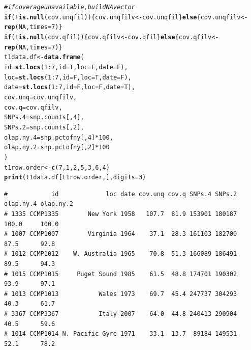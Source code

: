 \documentclass{article}\usepackage[]{graphicx}\usepackage[]{color}
\makeatletter
\newcommand{\hlnum}[1]{\textcolor[rgb]{0.686,0.059,0.569}{#1}}%
\newcommand{\hlcom}[1]{\textcolor[rgb]{0.678,0.584,0.686}{\textit{#1}}}%
\newcommand{\hlopt}[1]{\textcolor[rgb]{0,0,0}{#1}}%
\newcommand{\hlstd}[1]{\textcolor[rgb]{0.345,0.345,0.345}{#1}}%
\newcommand{\hlkwa}[1]{\textcolor[rgb]{0.161,0.373,0.58}{\textbf{#1}}}%
\newcommand{\hlkwb}[1]{\textcolor[rgb]{0.69,0.353,0.396}{#1}}%
\newcommand{\hlkwc}[1]{\textcolor[rgb]{0.333,0.667,0.333}{#1}}%
\newcommand{\hlkwd}[1]{\textcolor[rgb]{0.737,0.353,0.396}{\textbf{#1}}}%
\newenvironment{kframe}{%
 \def\at@end@of@kframe{}%
 \ifinner\ifhmode%
  \def\at@end@of@kframe{\end{minipage}}%
  \begin{minipage}{\columnwidth}%
 \fi\fi%
 \def\FrameCommand##1{\hskip\@totalleftmargin \hskip-\fboxsep
 \colorbox{shadecolor}{##1}\hskip-\fboxsep
     \hskip-\linewidth \hskip-\@totalleftmargin \hskip\columnwidth}%
 \MakeFramed {\advance\hsize-\width
   \@totalleftmargin\z@ \linewidth\hsize
   \@setminipage}}%
 {\par\unskip\endMakeFramed%
 \at@end@of@kframe}
\newenvironment{knitrout}{}{} %
\makeatother
\begin{document}
\begin{knitrout}\footnotesize
{}\color{fgcolor}\begin{kframe}
\begin{alltt}
\hlcom{# if coverage unavailable, build NA vector}
\hlkwa{if}\hlstd{(}\hlopt{!}\hlkwd{is.null}\hlstd{(cov.unqfil))\{cov.unqfilv} \hlkwb{<-} \hlstd{cov.unqfil\}} \hlkwa{else} \hlstd{\{cov.unqfilv} \hlkwb{<-} \hlkwd{rep}\hlstd{(}\hlnum{NA}\hlstd{,}\hlkwc{times}\hlstd{=}\hlnum{7}\hlstd{)\}}
\hlkwa{if}\hlstd{(}\hlopt{!}\hlkwd{is.null}\hlstd{(cov.qfil  ))\{cov.qfilv}   \hlkwb{<-} \hlstd{cov.qfil  \}} \hlkwa{else} \hlstd{\{cov.qfilv}   \hlkwb{<-} \hlkwd{rep}\hlstd{(}\hlnum{NA}\hlstd{,}\hlkwc{times}\hlstd{=}\hlnum{7}\hlstd{)\}}
\hlstd{t1data.df} \hlkwb{<-} \hlkwd{data.frame}\hlstd{(}
  \hlkwc{id}        \hlstd{=} \hlkwd{st.locs}\hlstd{(}\hlnum{1}\hlopt{:}\hlnum{7}\hlstd{,} \hlkwc{id}\hlstd{=T,} \hlkwc{loc}\hlstd{=F,} \hlkwc{date}\hlstd{=F),}
  \hlkwc{loc}       \hlstd{=} \hlkwd{st.locs}\hlstd{(}\hlnum{1}\hlopt{:}\hlnum{7}\hlstd{,} \hlkwc{id}\hlstd{=F,} \hlkwc{loc}\hlstd{=T,} \hlkwc{date}\hlstd{=F),}
  \hlkwc{date}      \hlstd{=} \hlkwd{st.locs}\hlstd{(}\hlnum{1}\hlopt{:}\hlnum{7}\hlstd{,} \hlkwc{id}\hlstd{=F,} \hlkwc{loc}\hlstd{=F,} \hlkwc{date}\hlstd{=T),}
  \hlkwc{cov.unq}   \hlstd{= cov.unqfilv,}
  \hlkwc{cov.q}     \hlstd{= cov.qfilv,}
  \hlkwc{SNPs.4}    \hlstd{= snp.counts[,}\hlnum{4}\hlstd{],}
  \hlkwc{SNPs.2}    \hlstd{= snp.counts[,}\hlnum{2}\hlstd{],}
  \hlkwc{olap.ny.4} \hlstd{= snp.pctofny[,}\hlnum{4}\hlstd{]}\hlopt{*}\hlnum{100}\hlstd{,}
  \hlkwc{olap.ny.2} \hlstd{= snp.pctofny[,}\hlnum{2}\hlstd{]}\hlopt{*}\hlnum{100}
\hlstd{)}
\hlstd{t1row.order} \hlkwb{<-} \hlkwd{c}\hlstd{(}\hlnum{7}\hlstd{,}\hlnum{1}\hlstd{,}\hlnum{2}\hlstd{,}\hlnum{5}\hlstd{,}\hlnum{3}\hlstd{,}\hlnum{6}\hlstd{,}\hlnum{4}\hlstd{)}
\hlkwd{print}\hlstd{(t1data.df[t1row.order,],}\hlkwc{digits}\hlstd{=}\hlnum{3}\hlstd{)}
\end{alltt}
\begin{verbatim}
#            id             loc date cov.unq cov.q SNPs.4 SNPs.2 olap.ny.4 olap.ny.2
# 1335 CCMP1335        New York 1958   107.7  81.9 153901 180187     100.0     100.0
# 1007 CCMP1007        Virginia 1964    37.1  28.3 161103 182700      87.5      92.8
# 1012 CCMP1012    W. Australia 1965    70.8  51.3 166089 186491      89.5      94.3
# 1015 CCMP1015     Puget Sound 1985    61.5  48.8 174701 190302      93.9      97.1
# 1013 CCMP1013           Wales 1973    69.7  45.4 247737 304293      40.3      61.7
# 3367 CCMP3367           Italy 2007    64.0  44.8 240413 290904      40.5      59.6
# 1014 CCMP1014 N. Pacific Gyre 1971    33.1  13.7  89184 149531      52.1      78.2
\end{verbatim}
\end{kframe}
\end{knitrout}
\end{document}
